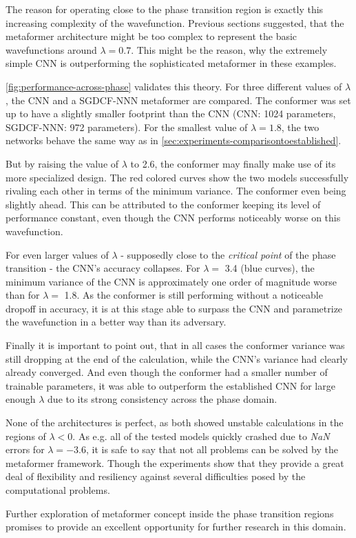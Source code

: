 The reason for operating close to the phase transition region is exactly this increasing complexity of the wavefunction.
Previous sections suggested, that the metaformer architecture might be too \glqq complex\grqq{} to represent the basic wavefunctions around $\lambda = 0.7$. 
This might be the reason, why the extremely simple CNN is outperforming the sophisticated metaformer in these examples.

\autoref{fig:performance-across-phase} validates this theory.
For three different values of $\lambda$, the CNN and a SGDCF-NNN metaformer are compared. 
The conformer was set up to have a slightly smaller footprint than the CNN (CNN: 1024 parameters, SGDCF-NNN: 972 parameters).
For the smallest value of $\lambda = 1.8$, the two networks behave the same way as in \autoref{sec:experiments-comparisontoestablished}. 

But by raising the value of $\lambda$ to \SI[]{2.6}[]{}, the conformer may finally make use of its more specialized design.
The red colored curves show the two models successfully rivaling each other in terms of the minimum variance.
The conformer even being slightly ahead.
This can be attributed to the conformer keeping its level of performance constant, even though the CNN performs noticeably worse on this wavefunction.

For even larger values of $\lambda$ - supposedly close to the \emph{critical point} of the phase transition - the CNN's accuracy collapses. 
For $\lambda=$ \SI[]{3.4}[]{} (blue curves), the minimum variance of the CNN is approximately one order of magnitude worse than for $\lambda=$ \SI[]{1.8}[]{}.
As the conformer is still performing without a noticeable dropoff in accuracy, it is at this stage able to surpass the CNN and parametrize the wavefunction in a better way than its adversary.

Finally it is important to point out, that in all cases the conformer variance was still dropping at the end of the calculation, while the CNN's variance had clearly already converged.
And even though the conformer had a smaller number of trainable parameters, it was able to outperform the established CNN for large enough $\lambda$ due to its strong consistency across the phase domain.

None of the architectures is perfect, as both showed unstable calculations in the regions of $\lambda < 0$. 
As e.g. all of the tested models quickly crashed due to \emph{NaN} errors for $\lambda = -3.6$, it is safe to say that not all problems can be solved by the metaformer framework.
Though the experiments show that they provide a great deal of flexibility and resiliency against several difficulties posed by the computational problems.

Further exploration of metaformer concept inside the phase transition regions promises to provide an excellent opportunity for further research in this domain.
